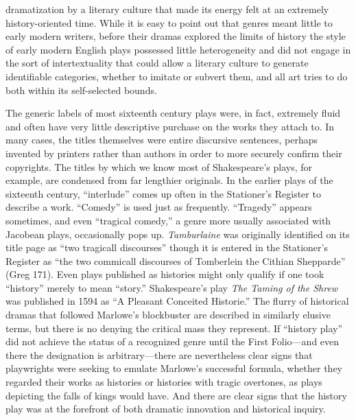 dramatization by a literary culture that made its energy felt at an extremely history-oriented time. While it is easy to point out that genres meant little to early modern writers, before their dramas explored the limits of history the style of early modern English plays possessed little heterogeneity and did not engage in the sort of intertextuality that could allow a literary culture to generate identifiable categories, whether to imitate or subvert them, and all art tries to do both within its self-selected bounds.

The generic labels of most sixteenth century plays were, in fact, extremely fluid and often have very little descriptive purchase on the works they attach to. In many cases, the titles themselves were entire discursive sentences, perhaps invented by printers rather than authors in order to more securely confirm their copyrights. The titles by which we know most of Shakespeare's plays, for example, are condensed from far lengthier originals. In the earlier plays of the sixteenth century, ``interlude'' comes up often in the Stationer's Register to describe a work. ``Comedy'' is used just as frequently. ``Tragedy'' appears sometimes, and even ``tragical comedy,'' a genre more usually associated with Jacobean plays, occasionally pops up. \emph{Tamburlaine} was originally identified on its title page as ``two tragicall discourses'' though it is entered in the Stationer's Register as ``the two commicall discourses of Tomberlein the Cithian Shepparde'' (Greg 171). Even plays published as histories might only qualify if one took ``history'' merely to mean ``story.'' Shakespeare's play \emph{The Taming of the Shrew} was published in 1594 as ``A Pleasant Conceited Historie.'' The flurry of historical dramas that followed Marlowe's blockbuster are described in similarly elusive terms, but there is no denying the critical mass they represent. If ``history play'' did not achieve the status of a recognized genre until the First Folio---and even there the designation is arbitrary---there are nevertheless clear signs that playwrights were seeking to emulate Marlowe's successful formula, whether they regarded their works as histories or histories with tragic overtones, as plays depicting the falls of kings would have. And there are clear signs that the history play was at the forefront of both dramatic innovation and historical inquiry.

